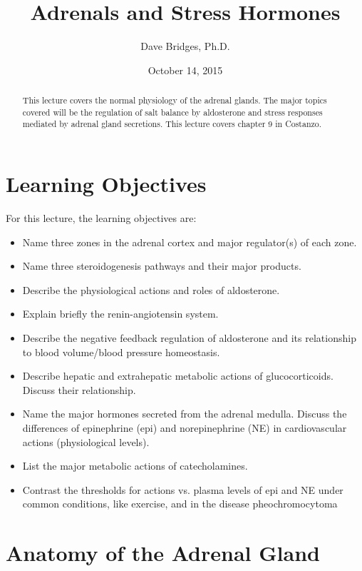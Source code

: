 \documentclass{tufte-handout}
\title{Adrenals and Stress Hormones}
\author{Dave Bridges, Ph.D.}
\date{October 14, 2015}
\begin{document}
\maketitle%

\begin{abstract}
\noindent This lecture covers the normal physiology of the adrenal glands.  The major topics covered will be the regulation of salt balance by aldosterone and stress responses mediated by adrenal gland secretions.  This lecture covers chapter 9 in Costanzo\cite{Costanzo2013}.
\end{abstract}

\tableofcontents

\pagebreak

\section{Learning Objectives}
For this lecture, the learning objectives are:
\begin{itemize}
\item Name three zones in the adrenal cortex and major regulator(s) of each zone.
\item Name three steroidogenesis pathways and their major products.
\item Describe the physiological actions and roles of aldosterone.
\item Explain briefly the renin-angiotensin system.
\item Describe the negative feedback regulation of aldosterone and its relationship to blood volume/blood pressure homeostasis.
\item Describe hepatic and extrahepatic metabolic actions of glucocorticoids. Discuss their relationship.
\item Name the major hormones secreted from the adrenal medulla. Discuss the differences of epinephrine (epi) and norepinephrine (NE) in cardiovascular actions (physiological levels). 
\item List the major metabolic actions of catecholamines.
\item Contrast the thresholds for actions vs. plasma levels of epi and NE under common conditions, like exercise, and in the disease pheochromocytoma

\end{itemize}

\pagebreak

\section{Anatomy of the Adrenal Gland}
\end{document}
